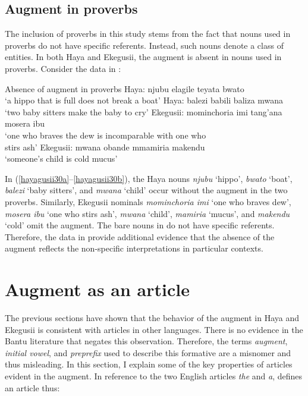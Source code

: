 \documentclass[output=paper]{langscibook}
\begin{document}
\subsection{Augment in proverbs}
The inclusion of proverbs in this study stems from the fact that nouns used in proverbs do not have specific referents. Instead, such nouns denote a class of entities. In both Haya and Ekegusii, the augment is absent in nouns used in proverbs. Consider the data in :

\ea Absence of augment in proverbs\smallskip
\label{hayagusii30}
  \ea\label{hayagusii30a} Haya:\hphantom{isit}		njubu elagile teyata bwato \\
\hphantom{Ekegusii: }‘a hippo that is full does not break a boat’
  \ex\label{hayagusii30b}	Haya:\hphantom{isit}		balezi babili baliza mwana \\
\hphantom{Ekegusii: }‘two baby sitters make the baby to cry’
  \ex\label{hayagusii30c}	Ekegusii: 	mominchoria imi tang’ana mosera ibu \\
\hphantom{Ekegusii: }‘one who braves the dew is incomparable with one who\\
\hphantom{Ekegusii: }stirs ash’
  \ex\label{hayagusii30d}	Ekegusii: 	mwana obande mmamiria makendu\\
\hphantom{Ekegusii: }‘someone’s child is cold mucus’
  \z
\z

In (\ref{hayagusii30a}--\ref{hayagusii30b}), the Haya nouns \textit{njubu} ‘hippo’, \textit{bwato} ‘boat’, \textit{balezi} ‘baby sitters’, and \textit{mwana} ‘child’ occur without the augment in the two proverbs. Similarly, Ekegusii nominals \textit{mominchoria imi} ‘one who braves dew’, \textit{mosera ibu} ‘one who stirs ash’, \textit{mwana} ‘child’, \textit{mamiria} ‘mucus’, and \textit{makendu} ‘cold’ omit the augment. The bare nouns in  do not have specific referents. Therefore, the data in  provide additional evidence that the absence of the augment reflects the non-specific interpretations in particular contexts.

\section{Augment as an article}\label{sec:choti:6}
The previous sections have shown that the behavior of the augment in Haya and Ekegusii is consistent with articles in other languages. There is no evidence in the Bantu literature that negates this observation. Therefore, the terms \textit{augment}, \textit{initial vowel}, and \textit{preprefix} used to describe this formative are a misnomer and thus misleading. In this section, I explain some of the key properties of articles evident in the augment. In reference to the two English articles \textit{the} and \textit{a}, \citet[36]{lyons1999definiteness}  defines an article thus:
\end{document}
